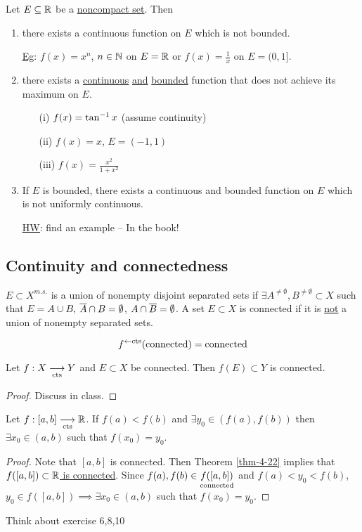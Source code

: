 \documentclass[]{article}
\begin{document}
\begin{theorem}
	\label{thm-4-20}
	Let $E\subseteq\mathbb{R}$ be a \ul{noncompact set}. Then
	\begin{enumerate}
		\item there exists a continuous function on $E$ which is not bounded.
			
			\ul{\ul{Eg}}: $f(x) = x^n$, $n\in\mathbb{N}$ on $E = \mathbb{R}$
			or $f(x) = \frac1x$ on $E = (0,1]$.
		\item there exists a \ul{continuous} \ul{and} \ul{bounded} function that does not achieve its maximum on $E$.
			\begin{enumerate}
				\item[(i)] $f(x) = \tan^{-1} x$ (assume continuity)
				\item[(ii)] $f(x) = x$, $E = (-1,1)$
				\item[(iii)] $f(x) = \frac{x^2}{1+x^2}$
			\end{enumerate}
		\item If $E$ is bounded, there exists a continuous and bounded function on $E$ which is not uniformly continuous.

			\ul{\ul{HW}}: find an example -- In the book!
	\end{enumerate}
\end{theorem}

\subsection*{Continuity and connectedness}

\begin{recall}
	$E\subset X^{m.s.}$ is a union of nonempty disjoint separated sets if $\exists A^{\neq\emptyset},B^{\neq\emptyset}\subset X$ such that $E = A\cup B$, $\overline{A}\cap B = \emptyset$, $A\cap\overline{B} = \emptyset$.
	A set $E\subset X$ is connected if it is \ul{not} a union of nonempty separated sets.
\end{recall}
$$f^{\leftarrow\text{cts}}(\text{connected}) = \text{connected}$$

\begin{theorem}
	\label{thm-4-22}
	Let $f:X\underset{\text{cts}}{\longrightarrow} Y$ and $E\subset X$ be connected.
	Then $f(E)\subset Y$ is connected.
\end{theorem}
\begin{proof}
	Discuss in class.
\end{proof}
\begin{theorem}
	Let $f:[a,b]\underset{\text{cts}}{\longrightarrow}\mathbb{R}$.
	If $f(a)<f(b)$ and $\exists y_0\in(f(a),f(b))$ then $\exists x_0\in(a,b)$ such that $f(x_0)=y_0$.
	\label{thm-4-23}
\end{theorem}
\begin{proof}
	Note that $[a,b]$ is connected. Then Theorem \ref{thm-4-22} implies that \ul{$f([a,b])\subset\mathbb{R}$ is connected}.
	Since $f(a),f(b)\in \underset{\text{connected}}{f([a,b])}$ and $f(a)<y_0<f(b)$, $y_0\in f([a,b]) \implies \exists x_0\in(a,b)$ such that $f(x_0)=y_0$.
\end{proof}
Think about exercise 6,8,10
\end{document}
